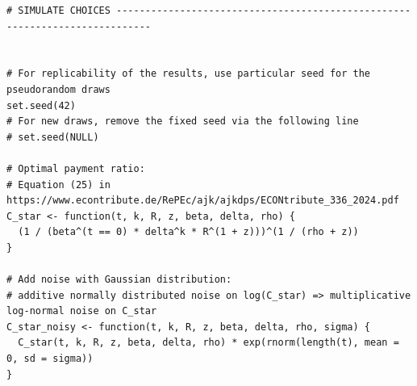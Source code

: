 \begin{lstlisting}
# SIMULATE CHOICES ----------------------------------------------------------------------------


# For replicability of the results, use particular seed for the pseudorandom draws
set.seed(42)
# For new draws, remove the fixed seed via the following line
# set.seed(NULL)

# Optimal payment ratio:
# Equation (25) in https://www.econtribute.de/RePEc/ajk/ajkdps/ECONtribute_336_2024.pdf
C_star <- function(t, k, R, z, beta, delta, rho) {
  (1 / (beta^(t == 0) * delta^k * R^(1 + z)))^(1 / (rho + z))
}

# Add noise with Gaussian distribution:
# additive normally distributed noise on log(C_star) => multiplicative log-normal noise on C_star
C_star_noisy <- function(t, k, R, z, beta, delta, rho, sigma) {
  C_star(t, k, R, z, beta, delta, rho) * exp(rnorm(length(t), mean = 0, sd = sigma))
}


\end{lstlisting}
